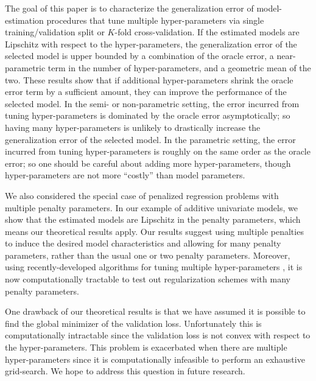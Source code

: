 \documentclass[12pt]{article} %
\theoremstyle{definition}
\begin{document}
The goal of this paper is to characterize the generalization error of model-estimation procedures that tune multiple hyper-parameters via single training/validation split or $K$-fold cross-validation. 
If the estimated models are Lipschitz with respect to the hyper-parameters, the generalization error of the selected model is upper bounded by a combination of the oracle error, a near-parametric term in the number of hyper-parameters, and a geometric mean of the two.
These results show that if additional hyper-parameters shrink the oracle error term by a sufficient amount, they can improve the performance of the selected model.
In the semi- or non-parametric setting, the error incurred from tuning hyper-parameters is dominated by the oracle error asymptotically; so having many hyper-parameters is unlikely to drastically increase the generalization error of the selected model.
In the parametric setting, the error incurred from tuning hyper-parameters is roughly on the same order as the oracle error; so one should be careful about adding more hyper-parameters, though hyper-parameters are not more ``costly'' than model parameters.


We also considered the special case of penalized regression problems with multiple penalty parameters. In our example of additive univariate models, we show that the estimated models are Lipschitz in the penalty parameters, which means our theoretical results apply. Our results suggest using multiple penalties to induce the desired model characteristics and allowing for many penalty parameters, rather than the usual one or two penalty parameters. Moreover, using recently-developed algorithms for tuning multiple hyper-parameters \citep{bengio2000gradient, foo2008efficient, snoek2012practical}, it is now computationally tractable to test out regularization schemes with many penalty parameters.

One drawback of our theoretical results is that we have assumed it is possible to find the global minimizer of the validation loss. Unfortunately this is computationally intractable since the validation loss is not convex with respect to the hyper-parameters. This problem is exacerbated when there are multiple hyper-parameters since it is computationally infeasible to perform an exhaustive grid-search. We hope to address this question in future research.


\vskip 14pt
\end{document}
